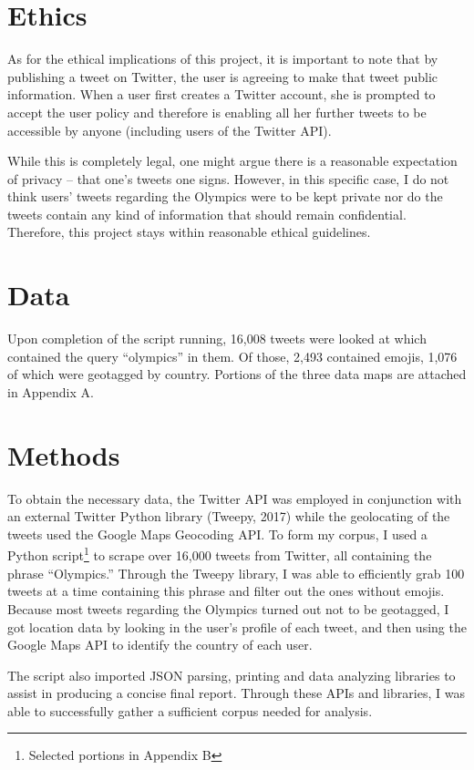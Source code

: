 \documentclass[a4paper,12pt]{article}
\begin{document}
\section{Ethics}
As for the ethical implications of this project, it is important to note that by publishing a tweet on Twitter, the user is agreeing to make that tweet public information. When a user first creates a Twitter account, she is prompted to accept the user policy and therefore is enabling all her further tweets to be accessible by anyone (including users of the Twitter API).

While this is completely legal, one might argue there is a reasonable expectation of privacy – that one’s tweets one signs. However, in this specific case, I do not think users’ tweets regarding the Olympics were to be kept private nor do the tweets contain any kind of information that should remain confidential. Therefore, this project stays within reasonable ethical guidelines.

\section{Data}
Upon completion of the script running, 16,008 tweets were looked at which contained the query “olympics” in them. Of those, 2,493 contained emojis, 1,076 of which were geotagged by country. Portions of the three data maps are attached in Appendix A. 
	
\section{Methods}
To obtain the necessary data, the Twitter API was employed in conjunction with an external Twitter Python library (Tweepy, 2017) while the geolocating of the tweets used the Google Maps Geocoding API. To form my corpus, I used a Python script\footnote{Selected portions in Appendix B} to scrape over 16,000 tweets from Twitter, all containing the phrase “Olympics.” Through the Tweepy library, I was able to efficiently grab 100 tweets at a time containing this phrase and filter out the ones without emojis. Because most tweets regarding the Olympics turned out not to be geotagged, I got location data by looking in the user’s profile of each tweet, and then using the Google Maps API to identify the country of each user. 

The script also imported JSON parsing, printing and data analyzing libraries to assist in producing a concise final report. Through these APIs and libraries, I was able to successfully gather a sufficient corpus needed for analysis.
\end{document}
